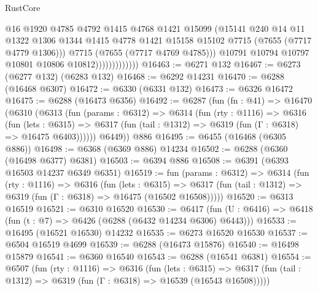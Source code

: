 \begin{lexlean}{RustCore}
\begin{coremodule}
                                @16
                                @1920
                                @4785
                                @4792
                                @1415
                                @4768
                                @1421
                                @15099
                                (@15141
                                  @240
                                  @14
                                  @11
                                  @1322
                                  @1306
                                  @1344
                                  @1415
                                  @4778
                                  @1421
                                  @15158
                                  @15102
                                  @7715
                                  (@7655 (@7717 @4779 @1306)))
                                @7715
                                (@7655 (@7717 @4769 @4785)))
                              @10791
                              @10794
                              @10797
                              @10801
                              @10806
                              @10812)))))))))))))
@16463 := @6271 @132
@16467 := @6273 (@6277 @132) (@6283 @132)
@16468 := @6292 @14231
@16470 := @6288 (@16468 @6307)
@16472 := @6330 (@6331 @132)
@16473 := @6326 @16472
@16475 := @6288 (@16473 @6356)
@16492 := @6287
    (fun (fn : @41) =>
    @16470
      (@6310
        (@6313
          (fun (params : @6312) =>
          @6314
            (fun (rty : @1116) =>
            @6316
              (fun (lets : @6315) =>
              @6317 (fun (tail : @1312) => @6319 (fun (Γ : @6318) => @16475 @6403))))))
        @6449))
    @886
@16495 := @6455 (@16468 (@6305 @886))
@16498 := @6368 (@6369 @886) @14234
@16502 := @6288 (@6360 (@16498 @6377) @6381)
@16503 := @6394 @886
@16508 := @6391 (@6393 @16503 @14237 @6349 @6351)
@16519 := fun (params : @6312) =>
  @6314
    (fun (rty : @1116) =>
    @6316
      (fun (lets : @6315) =>
      @6317 (fun (tail : @1312) => @6319 (fun (Γ : @6318) => @16475 (@16502 @16508)))))
@16520 := @6313 @16519
@16521 := @6310 @16520
@16530 := @6417
    (fun (U : @6416) => @6418 (fun (t : @7) => @6426 (@6288 (@6432 @14234 @6306) @6443)))
@16533 := @16495 (@16521 @16530) @14232
@16535 := @6273 @16520 @16530
@16537 := @6504 @16519 @4699
@16539 := @6288 (@16473 @15876)
@16540 := @16498 @15879
@16541 := @6360 @16540
@16543 := @6288 (@16541 @6381)
@16554 := @6507
    (fun (rty : @1116) =>
    @6316
      (fun (lets : @6315) =>
      @6317 (fun (tail : @1312) => @6319 (fun (Γ : @6318) => @16539 (@16543 @16508)))))

\end{coremodule}
\end{lexlean}

